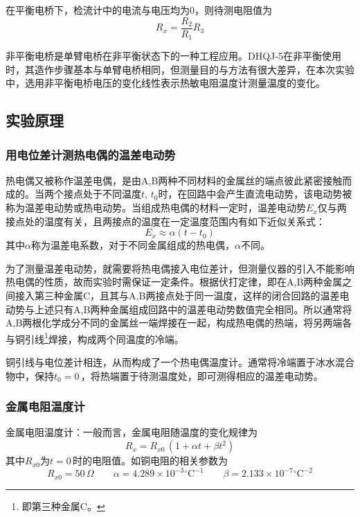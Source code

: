 \documentclass[UTF8]{article}
\theoremstyle{MyLineTheoremStyle} %
\theoremstyle{MyBlockTheoremStyle} %
\theoremstyle{MySubsubsectionStyle} %
\begin{document}
在平衡电桥下，检流计中的电流与电压均为0，则待测电阻值为
\begin{equation}
R_x=\frac{R_2}{R_1}R_3
\end{equation}

非平衡电桥是单臂电桥在非平衡状态下的一种工程应用。DHQJ-5在非平衡使用时，其造作步骤基本与单臂电桥相同，但测量目的与方法有很大差异，在本次实验中，选用非平衡电桥电压的变化线性表示热敏电阻温度计测量温度的变化。

\subsection{实验原理}
\subsubsection{用电位差计测热电偶的温差电动势}
热电偶又被称作温差电偶，是由A,B两种不同材料的金属丝的端点彼此紧密接触而成的。当两个接点处于不同温度$ t,\,t_0 $时，在回路中会产生直流电动势，该电动势被称为温差电动势或热电动势。当组成热电偶的材料一定时，温差电动势$ E_x $仅与两接点处的温度有关，且两接点的温度在一定温度范围内有如下近似关系式：
\begin{equation}
E_x\approx\alpha(t-t_0)
\end{equation}
其中$ \alpha $称为温差电系数，对于不同金属组成的热电偶，$ \alpha $不同。%

为了测量温差电动势，就需要将热电偶接入电位差计，但测量仪器的引入不能影响热电偶的性质，故而实验时需保证一定条件。根据伏打定律，即在A,B两种金属之间接入第三种金属C，且其与A,B两接点处于同一温度，这样的闭合回路的温差电动势与上述只有A,B两种金属组成回路中的温差电动势数值完全相同。所以通常将A,B两根化学成分不同的金属丝一端焊接在一起，构成热电偶的热端，将另两端各与铜引线\footnote{即第三种金属C。}焊接，构成两个同温度的冷端。

铜引线与电位差计相连，从而构成了一个热电偶温度计。通常将冷端置于冰水混合物中，保持$ t_0=0 $\,\textcelsius，将热端置于待测温度处，即可测得相应的温差电动势。%


\subsubsection{金属电阻温度计}


金属电阻温度计：一般而言，金属电阻随温度的变化规律为
\begin{equation}
R_x=R_{x0}\,(1+\alpha t+\beta t^2)
\end{equation}
其中$ R_{x0} $为$ t=0 $\,\textcelsius 时的电阻值。如铜电阻的相关参数为
\begin{equation}
R_{x0}=50\,\Omega\qquad \alpha=4.289\times10^{-3}\mathrm{^\circ C}^{-1}\qquad \beta=2.133\times10^{-7}\mathrm{^\circ C}^{-2}
\end{equation}
\end{document}

